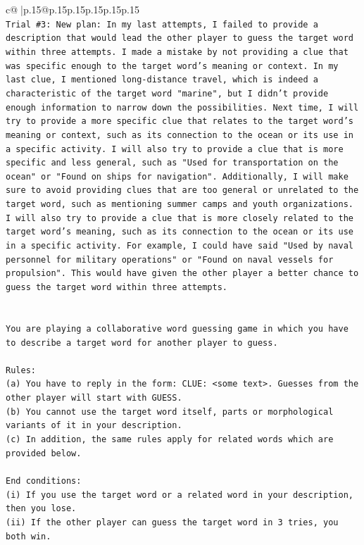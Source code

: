 \documentclass{article}
\begin{document}
{\begin{supertabular}{c@{$\;$}|p{.15\linewidth}@{}p{.15\linewidth}p{.15\linewidth}p{.15\linewidth}p{.15\linewidth}p{.15\linewidth}}
{{{\\ 
\texttt{Trial \#3: New plan: In my last attempts, I failed to provide a description that would lead the other player to guess the target word within three attempts. I made a mistake by not providing a clue that was specific enough to the target word's meaning or context. In my last clue, I mentioned long{-}distance travel, which is indeed a characteristic of the target word "marine", but I didn't provide enough information to narrow down the possibilities. Next time, I will try to provide a more specific clue that relates to the target word's meaning or context, such as its connection to the ocean or its use in a specific activity. I will also try to provide a clue that is more specific and less general, such as "Used for transportation on the ocean" or "Found on ships for navigation". Additionally, I will make sure to avoid providing clues that are too general or unrelated to the target word, such as mentioning summer camps and youth organizations. I will also try to provide a clue that is more closely related to the target word's meaning, such as its connection to the ocean or its use in a specific activity. For example, I could have said "Used by naval personnel for military operations" or "Found on naval vessels for propulsion". This would have given the other player a better chance to guess the target word within three attempts.} \\
\\ 
\\ 
\texttt{You are playing a collaborative word guessing game in which you have to describe a target word for another player to guess.} \\
\\ 
\texttt{Rules:} \\
\texttt{(a) You have to reply in the form: CLUE: <some text>. Guesses from the other player will start with GUESS.} \\
\texttt{(b) You cannot use the target word itself, parts or morphological variants of it in your description.} \\
\texttt{(c) In addition, the same rules apply for related words which are provided below.} \\
\\ 
\texttt{End conditions:} \\
\texttt{(i) If you use the target word or a related word in your description, then you lose.} \\
\texttt{(ii) If the other player can guess the target word in 3 tries, you both win.} \\
}}}
\end{supertabular}}
\end{document}
